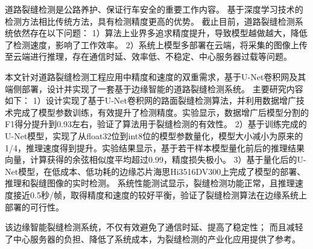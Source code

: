 	
\begin{chineseabstract}
道路裂缝检测是公路养护、保证行车安全的重要工作内容。
基于深度学习技术的检测方法相比传统方法，具有检测精度更高的优势。
截止目前，道路裂缝检测系统依然存在以下问题：
1）算法上业界多追求精度提升，导致模型越做越大，降低了检测速度，影响了工作效率。
2）系统上模型多部署在云端，将采集的图像上传至云端进行推理，存在通信时延、效率低、不稳定、中心服务器过载等问题。


本文针对道路裂缝检测工程应用中精度和速度的双重需求，基于U-Net卷积网及其端侧部署，设计并实现了一套基于边缘智能的道路裂缝检测系统。
主要研究内容如下：
1）设计实现了基于U-Net卷积网的路面裂缝检测算法，并利用数据增广技术完成了模型参数训练，有效提升了检测精度。实验显示，数据增广后模型分割的F1得分提升到0.93左右，验证了算法用于裂缝检测的有效性。
2）基于训练完成的U-Net模型，实现了从float32位到int8位的模型参数量化，模型大小减小为原来的1/4，推理速度得到提升。实验结果显示，基于若干样本模型量化前后的推理结果向量，计算获得的余弦相似度平均超过0.99，精度损失极小。
3）基于量化后的U-Net模型，在低成本、低功耗的边缘芯片海思Hi3516DV300上完成了模型的部署、推理和裂缝图像的实时检测。
系统性能测试显示，裂缝检测功能正常，且推理速度接近0.5秒/帧，取得精度和速度的较好平衡，验证了裂缝检测算法在边缘系统上部署的可行性。


该边缘智能裂缝检测系统，不仅有效避免了通信时延、提高了稳定性；
而且减轻了中心服务器的负担、降低了系统成本，为裂缝检测的产业化应用提供了参考。

\end{chineseabstract}

